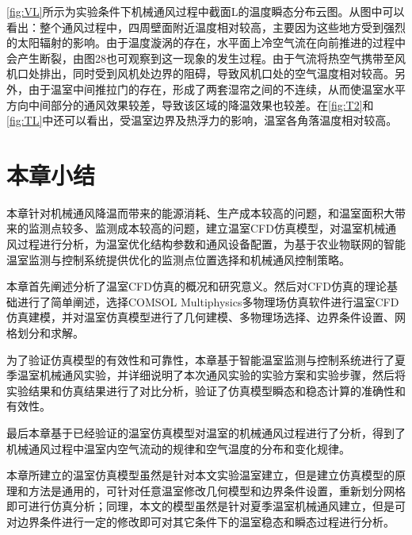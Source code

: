 \ref{fig:VL}所示为实验条件下机械通风过程中截面L的温度瞬态分布云图。从图中可以看出：整个通风过程中，四周壁面附近温度相对较高，主要因为这些地方受到强烈的太阳辐射的影响。由于温度漩涡的存在，水平面上冷空气流在向前推进的过程中会产生断裂，由图28也可观察到这一现象的发生过程。由于气流将热空气携带至风机口处排出，同时受到风机处边界的阻碍，导致风机口处的空气温度相对较高。另外，由于温室中间推拉门的存在，形成了两套湿帘之间的不连续，从而使温室水平方向中间部分的通风效果较差，导致该区域的降温效果也较差。在\ref{fig:T2}和\ref{fig:TL}中还可以看出，受温室边界及热浮力的影响，温室各角落温度相对较高。

\section{本章小结}
本章针对机械通风降温而带来的能源消耗、生产成本较高的问题，和温室面积大带来的监测点较多、监测成本较高的问题，建立温室CFD仿真模型，对温室机械通风过程进行分析，为温室优化结构参数和通风设备配置，为基于农业物联网的智能温室监测与控制系统提供优化的监测点位置选择和机械通风控制策略。

本章首先阐述分析了温室CFD仿真的概况和研究意义。然后对CFD仿真的理论基础进行了简单阐述，选择COMSOL Multiphysics多物理场仿真软件进行温室CFD仿真建模，并对温室仿真模型进行了几何建模、多物理场选择、边界条件设置、网格划分和求解。

为了验证仿真模型的有效性和可靠性，本章基于智能温室监测与控制系统进行了夏季温室机械通风实验，并详细说明了本次通风实验的实验方案和实验步骤，然后将实验结果和仿真结果进行了对比分析，验证了仿真模型瞬态和稳态计算的准确性和有效性。

最后本章基于已经验证的温室仿真模型对温室的机械通风过程进行了分析，得到了机械通风过程中温室内空气流动的规律和空气温度的分布和变化规律。

本章所建立的温室仿真模型虽然是针对本文实验温室建立，但是建立仿真模型的原理和方法是通用的，可针对任意温室修改几何模型和边界条件设置，重新划分网格即可进行仿真分析；同理，本文的模型虽然是针对夏季温室机械通风建立，但是可对边界条件进行一定的修改即可对其它条件下的温室稳态和瞬态过程进行分析。